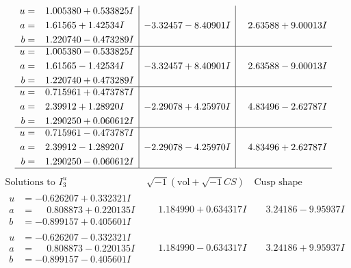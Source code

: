 \documentclass[1p]{elsarticle_modified}
\theoremstyle{definition}
\newcommand{\I}{\sqrt{-1}}
\begin{document}
$$\begin{array}{c|c|c}
\begin{aligned}
u &= \phantom{-}1.005380 + 0.533825 I \\
a &= \phantom{-}1.61565 + 1.42534 I \\
b &= \phantom{-}1.220740 - 0.473289 I\end{aligned}
 & -3.32457 - 8.40901 I & \phantom{-}2.63588 + 9.00013 I \\ \hline\begin{aligned}
u &= \phantom{-}1.005380 - 0.533825 I \\
a &= \phantom{-}1.61565 - 1.42534 I \\
b &= \phantom{-}1.220740 + 0.473289 I\end{aligned}
 & -3.32457 + 8.40901 I & \phantom{-}2.63588 - 9.00013 I \\ \hline\begin{aligned}
u &= \phantom{-}0.715961 + 0.473787 I \\
a &= \phantom{-}2.39912 + 1.28920 I \\
b &= \phantom{-}1.290250 + 0.060612 I\end{aligned}
 & -2.29078 + 4.25970 I & \phantom{-}4.83496 - 2.62787 I \\ \hline\begin{aligned}
u &= \phantom{-}0.715961 - 0.473787 I \\
a &= \phantom{-}2.39912 - 1.28920 I \\
b &= \phantom{-}1.290250 - 0.060612 I\end{aligned}
 & -2.29078 - 4.25970 I & \phantom{-}4.83496 + 2.62787 I\\
 \hline 
 \end{array}$$\newpage$$\begin{array}{c|c|c}  
\text{Solutions to }I^u_{3}& \I (\text{vol} + \sqrt{-1}CS) & \text{Cusp shape}\\
 \hline 
\begin{aligned}
u &= -0.626207 + 0.332321 I \\
a &= \phantom{-}0.808873 + 0.220135 I \\
b &= -0.899157 + 0.405601 I\end{aligned}
 & \phantom{-}1.184990 + 0.634317 I & \phantom{-}3.24186 - 9.95937 I \\ \hline\begin{aligned}
u &= -0.626207 - 0.332321 I \\
a &= \phantom{-}0.808873 - 0.220135 I \\
b &= -0.899157 - 0.405601 I\end{aligned}
 & \phantom{-}1.184990 - 0.634317 I & \phantom{-}3.24186 + 9.95937 I \\ \hline\begin{aligned}

\end{aligned}
\end{array}$$
\end{document}
